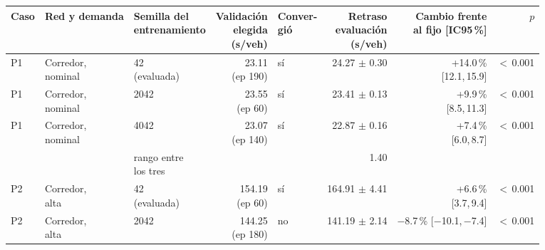 \begin{table}[H]
\centering
\scriptsize
\setlength{\tabcolsep}{3pt}
\begin{tabular}{lllrlrrr}
\toprule
Caso & Red y demanda & \makecell{Semilla del\\entrenamiento} & \makecell{Validación\\elegida\\(s/veh)} & \makecell{Conver-\\gió} & \makecell{Retraso\\evaluación\\(s/veh)} & \makecell{Cambio frente\\al fijo [IC95\,\%]} & $p$ \\
\midrule
P1 & \makecell[l]{Corredor,\\{}nominal} & \makecell[l]{42\\{}(evaluada)} & \makecell[r]{23.11\\{}(ep 190)} & sí & \makecell[r]{24.27\\{}$\pm$ 0.30} & \makecell[r]{+14.0\,\%\\{}[12.1,\,15.9]} & $<$\,0.001 \\
P1 & \makecell[l]{Corredor,\\{}nominal} & 2042 & \makecell[r]{23.55\\{}(ep 60)} & sí & \makecell[r]{23.41\\{}$\pm$ 0.13} & \makecell[r]{+9.9\,\%\\{}[8.5,\,11.3]} & $<$\,0.001 \\
P1 & \makecell[l]{Corredor,\\{}nominal} & 4042 & \makecell[r]{23.07\\{}(ep 140)} & sí & \makecell[r]{22.87\\{}$\pm$ 0.16} & \makecell[r]{+7.4\,\%\\{}[6.0,\,8.7]} & $<$\,0.001 \\
 & & \makecell[l]{rango entre\\{}los tres} & & & 1.40 & & \\
P2 & \makecell[l]{Corredor,\\{}alta} & \makecell[l]{42\\{}(evaluada)} & \makecell[r]{154.19\\{}(ep 60)} & sí & \makecell[r]{164.91\\{}$\pm$ 4.41} & \makecell[r]{+6.6\,\%\\{}[3.7,\,9.4]} & $<$\,0.001 \\
P2 & \makecell[l]{Corredor,\\{}alta} & 2042 & \makecell[r]{144.25\\{}(ep 180)} & no & \makecell[r]{141.19\\{}$\pm$ 2.14} & \makecell[r]{$-$8.7\,\%\\{}[$-$10.1,\,$-$7.4]} & $<$\,0.001 \\

\end{tabular}
\end{table}
